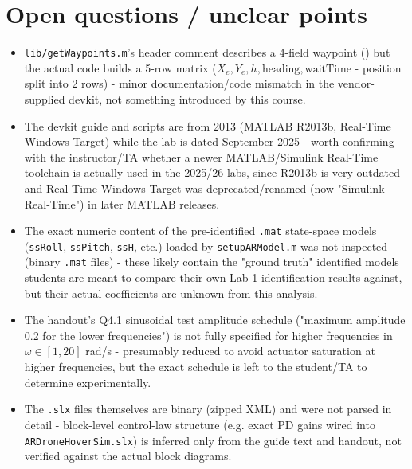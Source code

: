 \documentclass[11pt]{article}
\begin{document}
\section{Open questions / unclear points}

\begin{itemize}
\item \texttt{lib/\allowbreak{}getWaypoints.m}'s header comment describes a 4-field waypoint () but the actual code builds a 5-row matrix ($X_e, Y_e, h, \text{heading}, \text{waitTime}$ - position split into 2 rows) - minor documentation/code mismatch in the vendor-supplied devkit, not something introduced by this course.
\item The devkit guide and scripts are from 2013 (MATLAB R2013b, Real-Time Windows Target) while the lab is dated September 2025 - worth confirming with the instructor/TA whether a newer MATLAB/Simulink Real-Time toolchain is actually used in the 2025/26 labs, since R2013b is very outdated and Real-Time Windows Target was deprecated/renamed (now "Simulink Real-Time") in later MATLAB releases.
\item The exact numeric content of the pre-identified \texttt{.mat} state-space models (\texttt{ssRoll}, \texttt{ssPitch}, \texttt{ssH}, etc.) loaded by \texttt{setupARModel.m} was not inspected (binary \texttt{.mat} files) - these likely contain the "ground truth" identified models students are meant to compare their own Lab 1 identification results against, but their actual coefficients are unknown from this analysis.
\item The handout's Q4.1 sinusoidal test amplitude schedule ("maximum amplitude 0.2 for the lower frequencies") is not fully specified for higher frequencies in $\omega\in[1,20]$ rad/s - presumably reduced to avoid actuator saturation at higher frequencies, but the exact schedule is left to the student/TA to determine experimentally.
\item The \texttt{.slx} files themselves are binary (zipped XML) and were not parsed in detail - block-level control-law structure (e.g. exact PD gains wired into \texttt{ARDroneHoverSim.slx}) is inferred only from the guide text and handout, not verified against the actual block diagrams.
\end{itemize}
\end{document}
